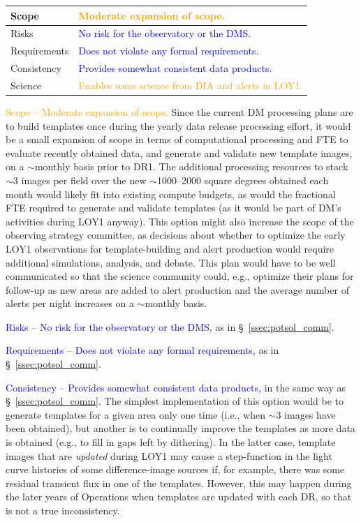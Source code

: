 \documentclass[DM,toc]{lsstdoc}
\begin{document}
\begin{center}
\begin{tabular}{|p{2.5cm}|p{13cm}|}
\hline
Scope & \textcolor{orange}{Moderate expansion of scope.} \\
\hline
Risks & \textcolor{blue}{No risk for the observatory or the DMS.} \\
\hline
Requirements & \textcolor{blue}{Does not violate any formal requirements.} \\
\hline
Consistency & \textcolor{blue}{Provides somewhat consistent data products.} \\
\hline
Science & \textcolor{orange}{Enables some science from DIA and alerts in LOY1.} \\
\hline
\end{tabular}
\end{center}

\textcolor{orange}{ Scope -- Moderate expansion of scope.}
Since the current DM processing plans are to build templates once during the yearly data release processing effort, it would be a small expansion of scope in terms of computational processing and FTE to evaluate recently obtained data, and generate and validate new template images, on a $\sim$monthly basis prior to DR1.
The additional processing resources to stack $\sim$3 images per field over the new $\sim$1000--2000 square degrees obtained each month would likely fit into existing compute budgets, as would the fractional FTE required to generate and validate templates (as it would be part of DM's activities during LOY1 anyway).
This option might also increase the scope of the observing strategy committee, as decisions about whether to optimize the early LOY1 observations for template-building and alert production would require additional simulations, analysis, and debate.
This plan would have to be well communicated so that the science community could, e.g., optimize their plans for follow-up as new areas are added to alert production and the average number of alerts per night increases on a $\sim$monthly basis.

\textcolor{blue}{ Risks -- No risk for the observatory or the DMS,} as in \S~\ref{ssec:potsol_comm}.

\textcolor{blue}{ Requirements -- Does not violate any formal requirements,} as in \S~\ref{ssec:potsol_comm}.

\textcolor{blue}{ Consistency -- Provides somewhat consistent data products,} in the same way as \S~\ref{ssec:potsol_comm}.
The simplest implementation of this option would be to generate templates for a given area only one time (i.e., when $\sim$3 images have been obtained), but another is to continually improve the templates as more data is obtained (e.g., to fill in gaps left by dithering).
In the latter case, template images that are {\em updated} during LOY1 may cause a step-function in the light curve histories of some difference-image sources if, for example, there was some residual transient flux in one of the templates.
However, this may happen during the later years of Operations when templates are updated with each DR, so that is not a true inconsistency.
\end{document}
